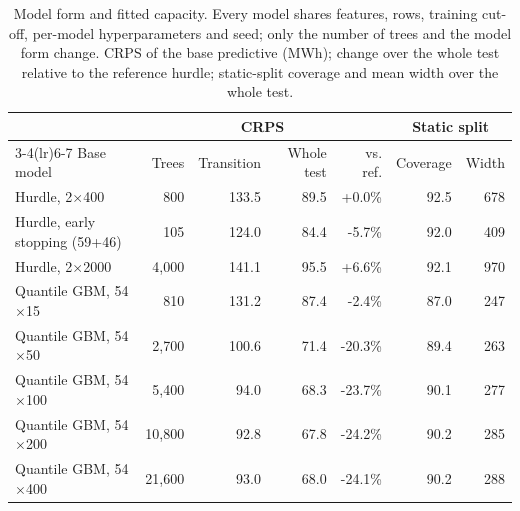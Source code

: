 \begin{table}[tp]
\centering
\footnotesize
\caption{Model form and fitted capacity. Every model shares features{,} rows{,} training cut-off{,} per-model hyperparameters and seed; only the number of trees and the model form change. CRPS of the base predictive (MWh); change over the whole test relative to the reference hurdle; static-split coverage and mean width over the whole test.}
\label{tab:escalera}
\begin{tabular}{l r rr r rr}
\toprule
 & & \multicolumn{2}{c}{CRPS} & & \multicolumn{2}{c}{Static split} \\
\cmidrule(lr){3-4}\cmidrule(lr){6-7}
Base model & Trees & Transition & Whole test & vs. ref. & Coverage & Width \\
\midrule
Hurdle{,} 2$\times$400 & 800 & 133.5 & 89.5 & +0.0\% & 92.5 & 678 \\
Hurdle{,} early stopping (59+46) & 105 & 124.0 & 84.4 & -5.7\% & 92.0 & 409 \\
Hurdle{,} 2$\times$2000 & 4{,}000 & 141.1 & 95.5 & +6.6\% & 92.1 & 970 \\
Quantile GBM{,} 54$\times$15 & 810 & 131.2 & 87.4 & -2.4\% & 87.0 & 247 \\
Quantile GBM{,} 54$\times$50 & 2{,}700 & 100.6 & 71.4 & -20.3\% & 89.4 & 263 \\
Quantile GBM{,} 54$\times$100 & 5{,}400 & 94.0 & 68.3 & -23.7\% & 90.1 & 277 \\
Quantile GBM{,} 54$\times$200 & 10{,}800 & 92.8 & 67.8 & -24.2\% & 90.2 & 285 \\
Quantile GBM{,} 54$\times$400 & 21{,}600 & 93.0 & 68.0 & -24.1\% & 90.2 & 288 \\
\bottomrule
\end{tabular}
\end{table}
